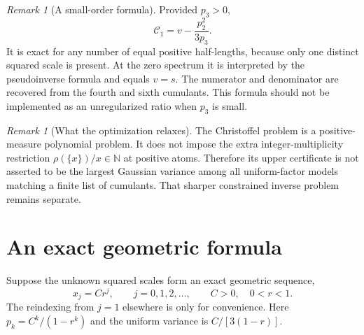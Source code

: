 \documentclass[11pt,letterpaper]{article}
\numberwithin{equation}{section}
\theoremstyle{definition}
\theoremstyle{remark}
\newtheorem{remark}[theorem]{Remark}
\newcommand{\N}{\mathbb N}
\newcommand{\Cs}{\mathcal C}
\begin{document}
\begin{remark}[A small-order formula]
Provided $p_3>0$,
\begin{equation}
 \Cs_1=v-\frac{p_2^2}{3p_3}.
 \label{eq:firstcertificate}
\end{equation}
It is exact for any number of equal positive half-lengths, because only one
distinct squared scale is present. At the zero spectrum it is interpreted by
the pseudoinverse formula and equals $v=s$. The numerator and denominator
are recovered from the fourth and sixth cumulants. This formula should not
be implemented as an unregularized ratio when $p_3$ is small.
\end{remark}

\begin{remark}[What the optimization relaxes]
The Christoffel problem is a positive-measure polynomial problem. It does not
impose the extra integer-multiplicity restriction
$\rho(\{x\})/x\in\N$ at positive atoms. Therefore its upper certificate is
not asserted to be the largest Gaussian variance among all uniform-factor
models matching a finite list of cumulants. That sharper constrained inverse
problem remains separate.
\end{remark}

\section{An exact geometric formula}
\label{sec:geometric}

Suppose the unknown squared scales form an exact geometric sequence,
\begin{equation}
 x_j=Cr^j,\qquad j=0,1,2,\ldots,
 \qquad C>0,\quad0<r<1.
 \label{eq:geometric}
\end{equation}
The reindexing from $j=1$ elsewhere is only for convenience. Here
$p_k=C^k/(1-r^k)$ and the uniform variance is $C/[3(1-r)]$.
\end{document}
